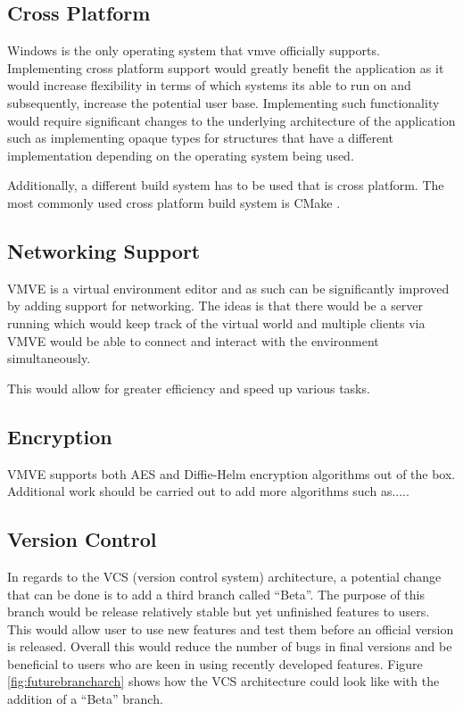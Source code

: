 \documentclass[11pt]{article}
\begin{document}
\subsection{Cross Platform}
Windows is the only operating system that \gls{vmve} officially supports.
Implementing cross platform support would greatly benefit the application as it
would increase flexibility in terms of which systems its able to run on and
subsequently, increase the potential user base. Implementing such functionality
would require significant changes to the underlying architecture of the
application such as implementing opaque types for structures that have a
different implementation depending on the operating system being used.

Additionally, a different build system has to be used that is cross platform.
The most commonly used cross platform build system is CMake \cite{cmake}.

\subsection{Networking Support}
VMVE is a virtual environment editor and as such can be significantly improved
by adding support for networking. The ideas is that there would be a server
running which would keep track of the virtual world and multiple clients via
VMVE would be able to connect and interact with the environment simultaneously.

This would allow for greater efficiency and speed up various tasks.

\subsection{Encryption}
VMVE supports both AES and Diffie-Helm encryption algorithms out of the box.
Additional work should be carried out to add more algorithms such as.....

\subsection{Version Control}
In regards to the VCS (version control system) architecture, a potential change
that can be done is to add a third branch called ``Beta''. The purpose of this
branch would be release relatively stable but yet unfinished features to users.
This would allow user to use new features and test them before an official
version is released. Overall this would reduce the number of bugs in final
versions and be beneficial to users who are keen in using recently developed
features. Figure \ref{fig:futurebrancharch} shows how the VCS architecture could
look like with the addition of a ``Beta'' branch.
\end{document}
